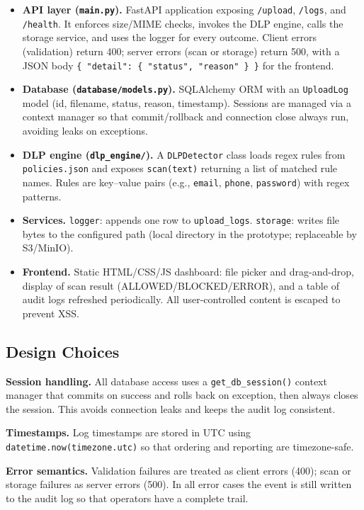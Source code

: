 \documentclass[11pt,a4paper]{article}
\begin{document}
\begin{itemize}
  \item \textbf{API layer (\texttt{main.py}).} FastAPI application exposing \texttt{/upload}, \texttt{/logs}, and \texttt{/health}. It enforces size/MIME checks, invokes the DLP engine, calls the storage service, and uses the logger for every outcome. Client errors (validation) return 400; server errors (scan or storage) return 500, with a JSON body \texttt{\{ "detail": \{ "status", "reason" \} \}} for the frontend.
  \item \textbf{Database (\texttt{database/models.py}).} SQLAlchemy ORM with an \texttt{UploadLog} model (id, filename, status, reason, timestamp). Sessions are managed via a context manager so that commit/rollback and connection close always run, avoiding leaks on exceptions.
  \item \textbf{DLP engine (\texttt{dlp\_engine/}).} A \texttt{DLPDetector} class loads regex rules from \texttt{policies.json} and exposes \texttt{scan(text)} returning a list of matched rule names. Rules are key--value pairs (e.g., \texttt{email}, \texttt{phone}, \texttt{password}) with regex patterns.
  \item \textbf{Services.} \texttt{logger}: appends one row to \texttt{upload\_logs}. \texttt{storage}: writes file bytes to the configured path (local directory in the prototype; replaceable by S3/MinIO).
  \item \textbf{Frontend.} Static HTML/CSS/JS dashboard: file picker and drag-and-drop, display of scan result (ALLOWED/BLOCKED/ERROR), and a table of audit logs refreshed periodically. All user-controlled content is escaped to prevent XSS.
\end{itemize}

\subsection{Design Choices}

\textbf{Session handling.} All database access uses a \texttt{get\_db\_session()} context manager that commits on success and rolls back on exception, then always closes the session. This avoids connection leaks and keeps the audit log consistent.

\textbf{Timestamps.} Log timestamps are stored in UTC using \texttt{datetime.now(timezone.utc)} so that ordering and reporting are timezone-safe.

\textbf{Error semantics.} Validation failures are treated as client errors (400); scan or storage failures as server errors (500). In all error cases the event is still written to the audit log so that operators have a complete trail.
\end{document}
